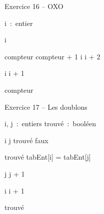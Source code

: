 \begin{Emphase}{Exercice 16 -- OXO}

\begin{pseudoN}


    \Decl i~:~entier

    \Let i 


            \Let compteur \Gets compteur + 1
            \Let i \Gets i + 2

        \EndIf

        \Let i \Gets i + 1

    \EndWhile

    \Write compteur

\EndModule

\end{pseudoN}

\end{Emphase}


\begin{Emphase}{Exercice 17 -- Les doublons}

\begin{pseudoN}


    \Decl i, j~:~entiers
    \Decl trouvé~:~booléen

    \Let i \Gets j 
    \Let trouvé \Gets faux



            \Let trouvé \Gets tabEnt[i] = tabEnt[j]

            \Let j \Gets j + 1

        \EndWhile

        \Let i \Gets i + 1

    \EndWhile

    \Return trouvé

\EndModule

\end{pseudoN}

\end{Emphase}

\newpage

